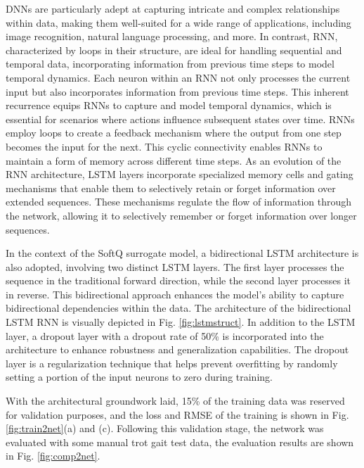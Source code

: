 DNNs are particularly adept at capturing intricate and complex relationships within data\cite{goodfellowDeepLearning2016}, making them well-suited for a wide range of applications, including image recognition, natural language processing, and more. In contrast, \ac{RNN}, characterized by loops in their structure, are ideal for handling sequential and temporal data, incorporating information from previous time steps to model temporal dynamics\cite{liptonCriticalReviewRecurrent2015}. Each neuron within an RNN not only processes the current input but also incorporates information from previous time steps. This inherent recurrence equips RNNs to capture and model temporal dynamics, which is essential for scenarios where actions influence subsequent states over time\cite{sherstinskyFundamentalsRecurrentNeural2020}. RNNs employ loops to create a feedback mechanism where the output from one step becomes the input for the next. This cyclic connectivity enables RNNs to maintain a form of memory across different time steps\cite{liptonCriticalReviewRecurrent2015}. As an evolution of the RNN architecture, \ac{LSTM} layers incorporate specialized memory cells and gating mechanisms that enable them to selectively retain or forget information over extended sequences\cite{yuReviewRecurrentNeural2019}. These mechanisms regulate the flow of information through the network, allowing it to selectively remember or forget information over longer sequences.


In the context of the SoftQ surrogate model, a bidirectional LSTM architecture is also adopted, involving two distinct LSTM layers. The first layer processes the sequence in the traditional forward direction, while the second layer processes it in reverse. This bidirectional approach enhances the model's ability to capture bidirectional dependencies within the data. The architecture of the bidirectional LSTM RNN is visually depicted in Fig. \ref{fig:lstmstruct}. In addition to the LSTM layer, a dropout layer with a dropout rate of 50\% is incorporated into the architecture to enhance robustness and generalization capabilities. The dropout layer is a regularization technique that helps prevent overfitting by randomly setting a portion of the input neurons to zero during training.

With the architectural groundwork laid, 15\% of the training data was reserved for validation purposes, and the loss and \ac{RMSE} of the training is shown in Fig. \ref{fig:train2net}(a) and (c). Following this validation stage, the network was evaluated with some manual trot gait test data, the evaluation results are shown in Fig. \ref{fig:comp2net}.

